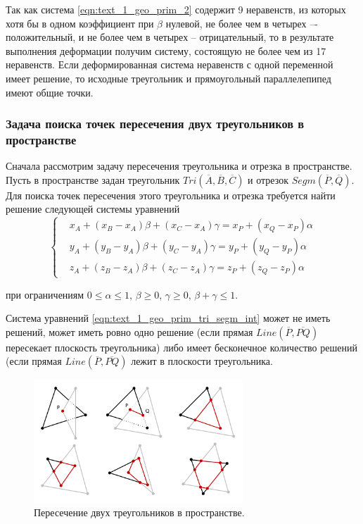 Так как система \eqref{eqn:text_1_geo_prim_2} содержит 9 неравенств, из которых хотя бы в одном коэффициент при $\beta$ нулевой, не более чем в четырех –- положительный, и не более чем в четырех -- отрицательный, то в результате выполнения деформации получим систему, состоящую не более чем из 17 неравенств.
Если деформированная система неравенств с одной переменной имеет решение, то исходные треугольник и прямоугольный параллелепипед имеют общие точки.

\subsubsection{Задача поиска точек пересечения двух треугольников в пространстве}

Сначала рассмотрим задачу пересечения треугольника и отрезка в пространстве.
Пусть в пространстве задан треугольник $Tri(\overline{A}, \overline{B}, \overline{C})$ и отрезок $Segm(\overline{P}, \overline{Q})$.
Для поиска точек пересечения этого треугольника и отрезка требуется найти решение следующей системы уравнений
\begin{equation}\label{eqn:text_1_geo_prim_tri_segm_int}
	\left\{
		\begin{aligned}
			& x_A + (x_B - x_A) \beta + (x_C - x_A) \gamma = x_P + (x_Q - x_P) \alpha \\
			& y_A + (y_B - y_A) \beta + (y_C - y_A) \gamma = y_P + (y_Q - y_P) \alpha \\
			& z_A + (z_B - z_A) \beta + (z_C - z_A) \gamma = z_P + (z_Q - z_P) \alpha
		\end{aligned}
	\right.
\end{equation}

при ограничениям $0 \le \alpha \le 1$, $\beta \ge 0$, $\gamma \ge 0$, $\beta + \gamma \le 1$.

Система уравнений \eqref{eqn:text_1_geo_prim_tri_segm_int} может не иметь решений, может иметь ровно одно решение (если прямая $Line(\overline{P}, \overline{PQ})$ пересекает плоскость треугольника) либо имеет бесконечное количество решений (если прямая $Line(\overline{P}, \overline{PQ})$ лежит в плоскости треугольника.

\begin{figure}[ht]
	\centering
	\includegraphics[width=0.7\textwidth]{./pics/text_1_geo_prim/tri_tri.pdf}
	\caption{Пересечение двух треугольников в пространстве.}
	\label{fig:text_1_geo_prim_tri_tri}
\end{figure}

